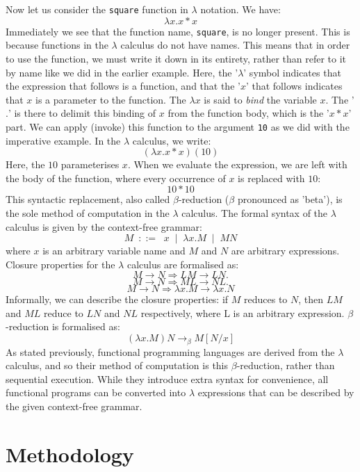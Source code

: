 \documentclass{article}
\begin{document}
\indent Now let us consider the \texttt{square} function in $\lambda$ notation. We have:
\[ \lambda x.x * x \]
Immediately we see that the function name, \texttt{square}, is no longer present. This is because functions in the $\lambda$ calculus do not have names. This means that in order to use the function, we must write it down in its entirety, rather than refer to it by name like we did in the earlier example. Here, the '$\lambda$' symbol indicates that the expression that follows is a function, and that the '$x$' that follows indicates that $x$ is a parameter to the function. The $\lambda x$ is said to \emph{bind} the variable $x$. The '$.$' is there to delimit this binding of $x$ from the function body, which is the '$x * x$' part. We can apply (invoke) this function to the argument \texttt{10} as we did with the imperative example. In the $\lambda$ calculus, we write:
\[ (\lambda x.x * x)(10) \]
Here, the $10$ parameterises $x$. When we evaluate the expression, we are left with the body of the function, where every occurrence of $x$ is replaced with $10$:
\[ 10 * 10 \]
This syntactic replacement, also called $\beta$-reduction ($\beta$ pronounced as 'beta'), is the sole method of computation in the $\lambda$ calculus. The formal syntax of the $\lambda$ calculus is given by the context-free grammar:
\[ M \:\; ::= \;\; x \;\; | \;\; \lambda x.M \;\; | \;\;  MN \]
where $x$ is an arbitrary variable name and $M$ and $N$ are arbitrary expressions. Closure properties for the $\lambda$ calculus are formalised as:
\[ M \rightarrow N \Rightarrow LM \rightarrow LN. \]
\[ M \rightarrow N \Rightarrow ML \rightarrow NL. \]
\[ M \rightarrow N \Rightarrow \lambda x.M \rightarrow \lambda x.N \]
Informally, we can describe the closure properties: if $M$ reduces to $N$, then $LM$ and $ML$ reduce to $LN$ and $NL$ respectively, where L is an arbitrary expression. $\beta$-reduction is formalised as:
\[ (\lambda x.M)N \rightarrow_\beta M[N/x] \]
\indent As stated previously, functional programming languages are derived from the $\lambda$ calculus, and so their method of computation is this $\beta$-reduction, rather than sequential execution. While they introduce extra syntax for convenience, all functional programs can be converted into $\lambda$ expressions that can be described by the given context-free grammar.

\pagebreak
\section{Methodology}
\end{document}
